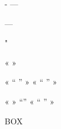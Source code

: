 

-
 — 

—

"

« »

 «  “ ” »
 «  “ ” »


« »
“”
 «  “ ” »

\tiny{}
\scriptsize{}
{\footnotesize}
\normalsize{}
\large{}
\Large{}
\LARGE{}
\huge{}
\Huge{}
BOX

\begin{center}
\setlength{\fboxsep}{3mm}
\fbox{
}
\end{center}

